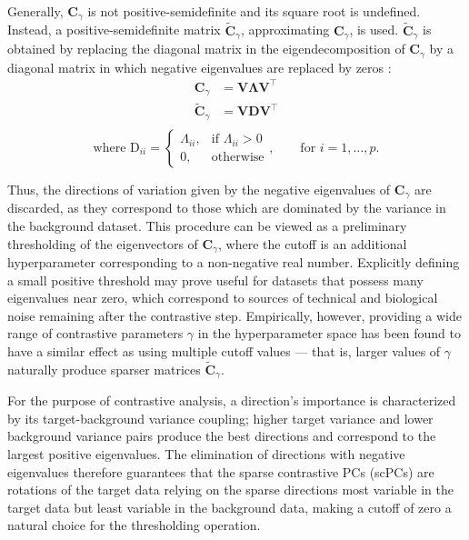Generally, $\mathbf{C}_\gamma$ is not positive-semidefinite and its square root
is undefined. Instead, a positive-semidefinite matrix
$\widetilde{\mathbf{C}}_\gamma$, approximating $\mathbf{C}_\gamma$, is used.
$\widetilde{\mathbf{C}}_\gamma$ is obtained by replacing the diagonal matrix in
the eigendecomposition of $\mathbf{C}_\gamma$ by a diagonal matrix in which
negative eigenvalues are replaced by zeros \citep{elasticnet}:
\begin{align*}
  \mathbf{C}_\gamma &= \mathbf{V}\mathbf{\Lambda}\mathbf{V}^\top \\
  \widetilde{\mathbf{C}}_\gamma &= \mathbf{V}\mathbf{D}\mathbf{V}^\top \\
\end{align*}
\begin{equation*}
\text{where } \text{D}_{ii} =
  \begin{cases}
    \Lambda_{ii}, & \text{if $\Lambda_{ii} > 0$} \\
    0, & \text{otherwise}
  \end{cases},
  \qquad 
  \text{for } i = 1, \ldots, p.
\end{equation*}

Thus, the directions of variation given by the negative eigenvalues of
$\mathbf{C}_\gamma$ are discarded, as they correspond to those which are
dominated by the variance in the background dataset. This procedure can be
viewed as a preliminary thresholding of the eigenvectors of $\mathbf{C}_\gamma$,
where the cutoff is an additional hyperparameter corresponding to a non-negative
real number. Explicitly defining a small positive threshold may prove useful for
datasets that possess many eigenvalues near zero, which correspond to sources of
technical and biological noise remaining after the contrastive step.
Empirically, however, providing a wide range of contrastive parameters $\gamma$
in the hyperparameter space has been found to have a similar effect as using
multiple cutoff values --- that is, larger values of $\gamma$ naturally produce
sparser matrices $\widetilde{\mathbf{C}}_{\gamma}$.

For the purpose of contrastive analysis, a direction's importance is
characterized by its target-background variance coupling; higher target variance
and lower background variance pairs produce the best directions \citep{Abid2018}
and correspond to the largest positive eigenvalues. The elimination of directions with negative eigenvalues
therefore guarantees that the sparse contrastive PCs (scPCs) are
rotations of the target data relying on the sparse directions most
variable in the target data but least variable in the background data, making
a cutoff of zero a natural choice for the thresholding operation.

